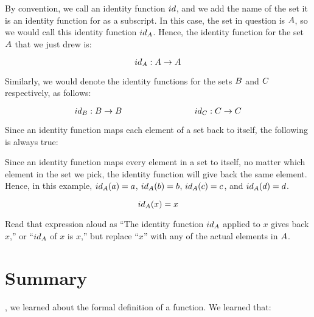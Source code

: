 \documentclass[../../../main.tex]{subfiles}
\begin{document}
By convention, we call an identity function $id$, and we add the name of the set it is an identity function for as a subscript. In this case, the set in question is $A$, so we would call this identity function $id_{A}$. Hence, the identity function for the set $A$ that we just drew is:

\begin{equation*}
  id_{A} : A \rightarrow A
\end{equation*}

Similarly, we would denote the identity functions for the sets $B$ and $C$ respectively, as follows: 

\begin{equation*}
  \func{id}_{\set{B}} : \set{B} \rightarrow \set{B} \hskip 3cm \func{id}_{\set{C}} : \set{C} \rightarrow \set{C}
\end{equation*}

Since an identity function maps each element of a set back to itself, the following is always true:

\begin{aside}
  \begin{remark}
    Since an identity function maps every element in a set to itself, no matter which element in the set we pick, the identity function will give back the same element. Hence, in this example, $id_{A}(a) = a$, $id_{A}(b) = b$, $id_{A}(c) = c$, and $id_{A}(d) = d$.
  \end{remark}
\end{aside}

\begin{equation*}
  id_{A}(x) = x
\end{equation*}

Read that expression aloud as ``The identity function $id_{A}$ applied to $x$ gives back $x$,'' or ``$id_{A}$ of $x$ is $x$,'' but replace ``$x$'' with any of the actual elements in $A$.


\section{Summary}

, we learned about the formal definition of a function. We learned that:
\end{document}

